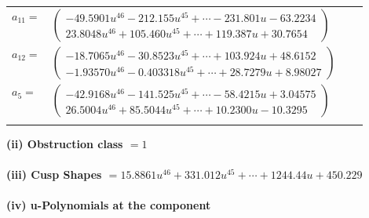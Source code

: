 \documentclass[1p]{elsarticle_modified}
\theoremstyle{definition}
\begin{document}
\begin{tabular}{m{7pt} m{180pt} m{7pt} m{180pt} }
\flushright $a_{11}=$&$\begin{pmatrix}-49.5901 u^{46}-212.155 u^{45}+\cdots-231.801 u-63.2234\\23.8048 u^{46}+105.460 u^{45}+\cdots+119.387 u+30.7654\end{pmatrix}$ \\
\flushright $a_{12}=$&$\begin{pmatrix}-18.7065 u^{46}-30.8523 u^{45}+\cdots+103.924 u+48.6152\\-1.93570 u^{46}-0.403318 u^{45}+\cdots+28.7279 u+8.98027\end{pmatrix}$ \\
\flushright $a_{5}=$&$\begin{pmatrix}-42.9168 u^{46}-141.525 u^{45}+\cdots-58.4215 u+3.04575\\26.5004 u^{46}+85.5044 u^{45}+\cdots+10.2300 u-10.3295\end{pmatrix}$\\&\end{tabular}
\flushleft \textbf{(ii) Obstruction class $= 1$}\\~\\
\flushleft \textbf{(iii) Cusp Shapes $= 15.8861 u^{46}+331.012 u^{45}+\cdots+1244.44 u+450.229$}\\~\\
\newpage\renewcommand{\arraystretch}{1}
\flushleft \textbf{(iv) u-Polynomials at the component}\newline \\
\end{document}
